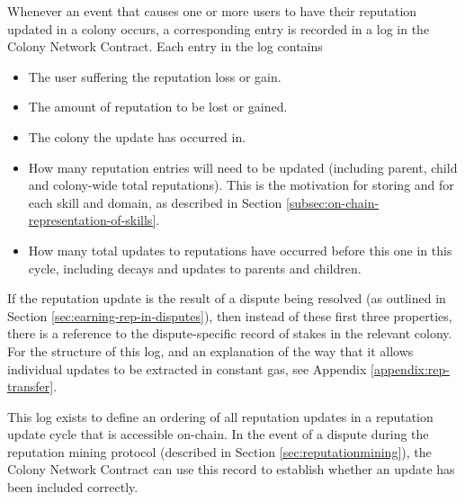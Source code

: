 Whenever an event that causes one or more users to have their reputation updated in a colony occurs, a corresponding entry is recorded in a log in the Colony Network Contract. Each entry in the log contains

\begin{itemize}
\item The user suffering the reputation loss or gain.
\item The amount of reputation to be lost or gained.
\item The colony the update has occurred in.
\item How many reputation entries will need to be updated (including parent, child and colony-wide total reputations). This is the motivation for storing  and  for each skill and domain, as described in Section \ref{subsec:on-chain-representation-of-skills}.
\item How many total updates to reputations have occurred before this one in this cycle, including decays and updates to parents and children.
\end{itemize}

If the reputation update is the result of a dispute being resolved (as outlined in Section \ref{sec:earning-rep-in-disputes}), then instead of these first three properties, there is a reference to the dispute-specific record of stakes in the relevant colony. For the structure of this log, and an explanation of the way that it allows individual updates to be extracted in constant gas, see Appendix \ref{appendix:rep-transfer}.

This log exists to define an ordering of all reputation updates in a reputation update cycle that is accessible on-chain. In the event of a dispute during the reputation mining protocol (described in Section \ref{sec:reputationmining}), the Colony Network Contract can use this record to establish whether an update has been included correctly.
